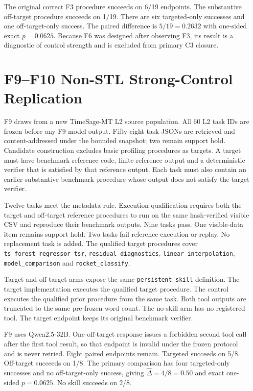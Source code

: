 The original correct F3 procedure succeeds on 6/19 endpoints. The substantive off-target procedure succeeds on 1/19. There are six targeted-only successes and one off-target-only success. The paired difference is $5/19=0.2632$ with one-sided exact $p=0.0625$. Because F6 was designed after observing F3, its result is a diagnostic of control strength and is excluded from primary C3 closure.

\section{F9--F10 Non-STL Strong-Control Replication}
\label{app:f9}
F9 draws from a new TimeSage-MT L2 source population. All 60 L2 task IDs are frozen before any F9 model output. Fifty-eight task JSONs are retrieved and content-addressed under the bounded snapshot; two remain support hold. Candidate construction excludes basic profiling procedures as targets. A target must have benchmark reference code, finite reference output and a deterministic verifier that is satisfied by that reference output. Each task must also contain an earlier substantive benchmark procedure whose output does not satisfy the target verifier.

Twelve tasks meet the metadata rule. Execution qualification requires both the target and off-target reference procedures to run on the same hash-verified visible CSV and reproduce their benchmark outputs. Nine tasks pass. One visible-data item remains support hold. Two tasks fail reference execution or replay. No replacement task is added. The qualified target procedures cover \texttt{ts\_forest\_regressor\_tsr}, \texttt{residual\_diagnostics}, \texttt{linear\_interpolation}, \texttt{model\_comparison} and \texttt{rocket\_classify}.

Target and off-target arms expose the same \texttt{persistent\_skill} definition. The target implementation executes the qualified target procedure. The control executes the qualified prior procedure from the same task. Both tool outputs are truncated to the same pre-frozen word count. The no-skill arm has no registered tool. The target endpoint keeps its original benchmark verifier.

F9 uses Qwen2.5-32B. One off-target response issues a forbidden second tool call after the first tool result, so that endpoint is invalid under the frozen protocol and is never retried. Eight paired endpoints remain. Targeted succeeds on 5/8. Off-target succeeds on 1/8. The primary comparison has four targeted-only successes and no off-target-only success, giving $\widehat{\Delta}=4/8=0.50$ and exact one-sided $p=0.0625$. No skill succeeds on 2/8.


